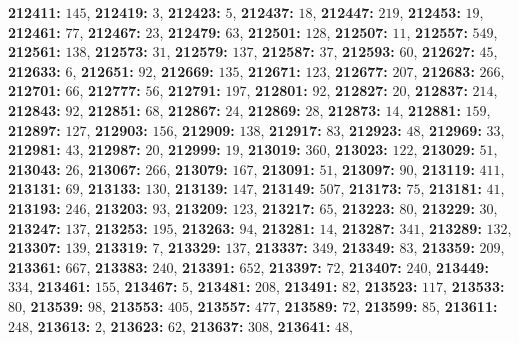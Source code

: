 \textsf{\bfseries 212411:} $145$, \textsf{\bfseries 212419:} $3$, \textsf{\bfseries 212423:} $5$, \textsf{\bfseries 212437:} $18$, \textsf{\bfseries 212447:} $219$, \textsf{\bfseries 212453:} $19$, \textsf{\bfseries 212461:} $77$, \textsf{\bfseries 212467:} $23$, \textsf{\bfseries 212479:} $63$, \textsf{\bfseries 212501:} $128$, \textsf{\bfseries 212507:} $11$, \textsf{\bfseries 212557:} $549$, \textsf{\bfseries 212561:} $138$, \textsf{\bfseries 212573:} $31$, \textsf{\bfseries 212579:} $137$, \textsf{\bfseries 212587:} $37$, \textsf{\bfseries 212593:} $60$, \textsf{\bfseries 212627:} $45$, \textsf{\bfseries 212633:} $6$, \textsf{\bfseries 212651:} $92$, \textsf{\bfseries 212669:} $135$, \textsf{\bfseries 212671:} $123$, \textsf{\bfseries 212677:} $207$, \textsf{\bfseries 212683:} $266$, \textsf{\bfseries 212701:} $66$, \textsf{\bfseries 212777:} $56$, \textsf{\bfseries 212791:} $197$, \textsf{\bfseries 212801:} $92$, \textsf{\bfseries 212827:} $20$, \textsf{\bfseries 212837:} $214$, \textsf{\bfseries 212843:} $92$, \textsf{\bfseries 212851:} $68$, \textsf{\bfseries 212867:} $24$, \textsf{\bfseries 212869:} $28$, \textsf{\bfseries 212873:} $14$, \textsf{\bfseries 212881:} $159$, \textsf{\bfseries 212897:} $127$, \textsf{\bfseries 212903:} $156$, \textsf{\bfseries 212909:} $138$, \textsf{\bfseries 212917:} $83$, \textsf{\bfseries 212923:} $48$, \textsf{\bfseries 212969:} $33$, \textsf{\bfseries 212981:} $43$, \textsf{\bfseries 212987:} $20$, \textsf{\bfseries 212999:} $19$, \textsf{\bfseries 213019:} $360$, \textsf{\bfseries 213023:} $122$, \textsf{\bfseries 213029:} $51$, \textsf{\bfseries 213043:} $26$, \textsf{\bfseries 213067:} $266$, \textsf{\bfseries 213079:} $167$, \textsf{\bfseries 213091:} $51$, \textsf{\bfseries 213097:} $90$, \textsf{\bfseries 213119:} $411$, \textsf{\bfseries 213131:} $69$, \textsf{\bfseries 213133:} $130$, \textsf{\bfseries 213139:} $147$, \textsf{\bfseries 213149:} $507$, \textsf{\bfseries 213173:} $75$, \textsf{\bfseries 213181:} $41$, \textsf{\bfseries 213193:} $246$, \textsf{\bfseries 213203:} $93$, \textsf{\bfseries 213209:} $123$, \textsf{\bfseries 213217:} $65$, \textsf{\bfseries 213223:} $80$, \textsf{\bfseries 213229:} $30$, \textsf{\bfseries 213247:} $137$, \textsf{\bfseries 213253:} $195$, \textsf{\bfseries 213263:} $94$, \textsf{\bfseries 213281:} $14$, \textsf{\bfseries 213287:} $341$, \textsf{\bfseries 213289:} $132$, \textsf{\bfseries 213307:} $139$, \textsf{\bfseries 213319:} $7$, \textsf{\bfseries 213329:} $137$, \textsf{\bfseries 213337:} $349$, \textsf{\bfseries 213349:} $83$, \textsf{\bfseries 213359:} $209$, \textsf{\bfseries 213361:} $667$, \textsf{\bfseries 213383:} $240$, \textsf{\bfseries 213391:} $652$, \textsf{\bfseries 213397:} $72$, \textsf{\bfseries 213407:} $240$, \textsf{\bfseries 213449:} $334$, \textsf{\bfseries 213461:} $155$, \textsf{\bfseries 213467:} $5$, \textsf{\bfseries 213481:} $208$, \textsf{\bfseries 213491:} $82$, \textsf{\bfseries 213523:} $117$, \textsf{\bfseries 213533:} $80$, \textsf{\bfseries 213539:} $98$, \textsf{\bfseries 213553:} $405$, \textsf{\bfseries 213557:} $477$, \textsf{\bfseries 213589:} $72$, \textsf{\bfseries 213599:} $85$, \textsf{\bfseries 213611:} $248$, \textsf{\bfseries 213613:} $2$, \textsf{\bfseries 213623:} $62$, \textsf{\bfseries 213637:} $308$, \textsf{\bfseries 213641:} $48$, 
